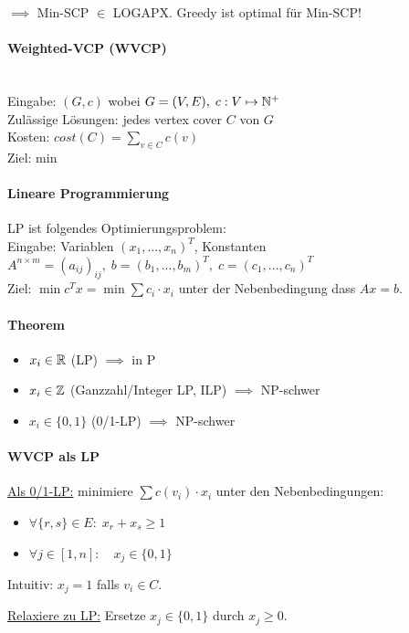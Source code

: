 $\implies$ Min-SCP $\in$ LOGAPX. Greedy ist optimal für Min-SCP!

\paragraph{Weighted-VCP (WVCP)} \mbox{} \\
Eingabe: $ (G, c)$ wobei $G=(V,E), \; c : V \mapsto \mathbb{N}^+ $ \\
Zulässige Lösungen: jedes vertex cover $C$ von $G$ \\
Kosten: $cost(C) = \sum_{v \in C} c(v)$ \\
Ziel: min

\paragraph{Lineare Programmierung}
LP ist folgendes Optimierungsproblem:
\\
Eingabe: Variablen $(x_1, ..., x_n)^T$,
Konstanten $A^{n \times m} = (a_{ij})_{ij}, \; b = (b_1, ..., b_m)^T, \; c = (c_1, ..., c_n)^T$
\\
Ziel: $\min c^T x = \min \sum c_i \cdot x_i$ unter der Nebenbedingung dass $Ax = b$.

\paragraph{Theorem}
\begin{itemize}
    \item $x_i \in \mathbb{R}$ (LP) $\implies$ in P
    \item $x_i \in \mathbb{Z}$ (Ganzzahl/Integer LP, ILP) $\implies$ NP-schwer
    \item $x_i \in \{0,1\}$ (0/1-LP) $\implies$ NP-schwer
\end{itemize}

\paragraph{WVCP als LP}
\underline{Als 0/1-LP:}
minimiere $\sum c(v_i) \cdot x_i$ \quad unter den Nebenbedingungen:
\begin{itemize}
    \item $\forall \{r,s\} \in E : \; x_r + x_s \geq 1$
    \item $\forall j \in [1,n] : \quad x_j \in \{0,1\}$
\end{itemize}
Intuitiv: $x_j = 1$ falls $v_i \in C$.

\underline{Relaxiere zu LP:}
Ersetze $x_j \in \{0,1\}$ durch $x_j \geq 0$.

